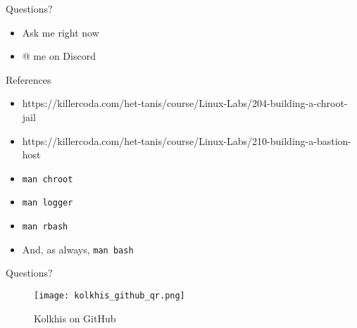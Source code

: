 \documentclass[14pt,compress,dvipsnames,aspectratio=169]{beamer} %
\begin{document}
\begin{frame}{Questions?}
    \begin{itemize}
        \vspace{1.0cm}
        \item{Ask me right now}
        \vspace{1.0cm}
        \item{@ me on Discord} 
    \end{itemize}
\end{frame}



\begin{frame}{References}
    \begin{itemize}
        \item{https://killercoda.com/het-tanis/course/Linux-Labs/204-building-a-chroot-jail}
        \item{https://killercoda.com/het-tanis/course/Linux-Labs/210-building-a-bastion-host}
        \item{\texttt{man chroot}}
        \item{\texttt{man logger}}
        \item{\texttt{man rbash}}
        \item{And, as always, \texttt{man bash}}
    \end{itemize}
\end{frame}

\begin{frame}{Questions?}
    \begin{figure}
        \centering
        \texttt{[image: kolkhis\_github\_qr.png]}
        \caption{Kolkhis on GitHub}
        \label{}
    \end{figure}
\end{frame}
\end{document}
